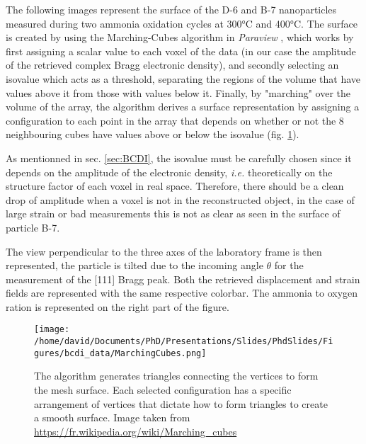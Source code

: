 The following images represent the surface of the D-6 and B-7 nanoparticles measured during two ammonia oxidation cycles at 300°C and 400°C.
The surface is created by using the Marching-Cubes algorithm \parencite{Lorensen1987} in \textit{Paraview} \parencite{Ahrens2001}, which works by first assigning a scalar value to each voxel of the data (in our case the amplitude of the retrieved complex Bragg electronic density), and secondly selecting an isovalue which acts as a threshold, separating the regions of the volume that have values above it from those with values below it.
Finally, by "marching" over the volume of the array, the algorithm derives a surface representation by assigning a configuration to each point in the array that depends on whether or not the 8 neighbouring cubes have values above or below the isovalue (fig. \ref{fig:MarchingCubes}).

As mentionned in sec. \ref{sec:BCDI}, the isovalue must be carefully chosen since it depends on the amplitude of the electronic density, \textit{i.e.} theoretically on the structure factor of each voxel in real space.
Therefore, there should be a clean drop of amplitude when a voxel is not in the reconstructed object, in the case of large strain or bad measurements this is not as clear as seen in the surface of particle B-7.

The view perpendicular to the three axes of the laboratory frame is then represented, the particle is tilted due to the incoming angle $\theta$ for the measurement of the [111] Bragg peak.
Both the retrieved displacement and strain fields are represented with the same respective colorbar.
The ammonia to oxygen ration is represented on the right part of the figure.

\begin{figure}[!htb]
    \centering
    \texttt{[image: /home/david/Documents/PhD/Presentations/Slides/PhdSlides/Figures/bcdi\_data/MarchingCubes.png]}
    \caption{
    The algorithm generates triangles connecting the vertices to form the mesh surface.
    Each selected configuration has a specific arrangement of vertices that dictate how to form triangles to create a smooth surface.
    Image taken from \url{https://fr.wikipedia.org/wiki/Marching_cubes}
    }
    \label{fig:MarchingCubes}
\end{figure}


